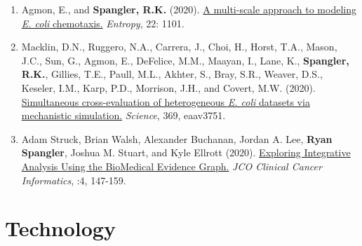 \begin{enumerate}
\item Agmon, E., and \textbf{Spangler, R.K.} (2020). \href{https://www.mdpi.com/1099-4300/22/10/1101}{A multi-scale approach to modeling \textit{E. coli} chemotaxis.} \textit{Entropy}, 22: 1101.
\item Macklin, D.N., Ruggero, N.A., Carrera, J., Choi, H., Horst, T.A., Mason, J.C., Sun, G., Agmon, E., DeFelice, M.M., Maayan, I., Lane, K., \textbf{Spangler, R.K.}, Gillies, T.E., Paull, M.L., Akhter, S., Bray, S.R., Weaver, D.S., Keseler, I.M., Karp, P.D., Morrison, J.H., and Covert, M.W. (2020). \href{https://science.sciencemag.org/content/369/6502/eaav3751.abstract}{Simultaneous cross-evaluation of heterogeneous \textit{E. coli} datasets via mechanistic simulation.} \textit{Science}, 369, eaav3751.
\item Adam Struck, Brian Walsh, Alexander Buchanan, Jordan A. Lee, \textbf{Ryan Spangler}, Joshua M. Stuart, and Kyle Ellrott (2020). \href{https://ascopubs.org/doi/full/10.1200/CCI.19.00110}{Exploring Integrative Analysis Using the BioMedical Evidence Graph.} \textit{JCO Clinical Cancer Informatics}, :4, 147-159.
\end{enumerate}

\section{Technology}


